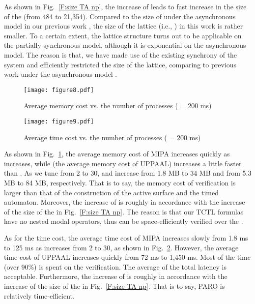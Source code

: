 \documentclass[10pt,conference,compsocconf,letterpaper]{IEEEtran}
\begin{document}
As shown in Fig.~\ref{F:size TA np}, the increase of  leads to fast increase in the size of the  (from 484 to 21,354). Compared to the size of  under the asynchronous model in our previous work \cite{Yang13}, the size of the lattice (i.e., ) in this work is rather smaller. To a certain extent, the lattice structure turns out to be applicable on the partially synchronous model, although it is exponential on the asynchronous model. The reason is that, we have made use of the existing synchrony of the system and efficiently restricted the size of the lattice, comparing to previous work under the asynchronous model \cite{Schwarz94, Yang13}.
\begin{figure}[tbp]
\begin{center}
  \texttt{[image: figure8.pdf]}
  \caption{Average memory cost vs. the number of processes ( = 200 ms)}
  \label{F:memory vs np}
\end{center}
\end{figure}
\begin{figure}[t]
\begin{center}
  \texttt{[image: figure9.pdf]}
  \caption{Average time cost vs. the number of processes ( = 200 ms)}
  \label{F:time vs np}
\end{center}
\end{figure}

As shown in Fig.~\ref{F:memory vs np}, the average memory cost of MIPA  increases quickly as  increases, while  (the average memory cost of UPPAAL) increases a little faster than . As we tune  from 2 to 30,  and  increase from 1.8 MB to 34 MB and from 5.3 MB to 84 MB, respectively. That is to say, the memory cost of verification is larger than that of the construction of the active surface and the timed automaton. Moreover, the increase of  is roughly in accordance with the increase of the size of the  in Fig.~\ref{F:size TA np}. The reason is that our TCTL formulas have no nested modal operators, thus can be space-efficiently verified over the .

As for the time cost, the average time cost of MIPA  increases slowly from 1.8 ms to 125 ms as  increases from 2 to 30, as shown in Fig.~\ref{F:time vs np}. However, the average time cost of UPPAAL  increases quickly from 72 ms to 1,450 ms. Most of the time (over 90\%) is spent on the verification. The average of the total latency is acceptable. Furthermore, the increase of  is roughly in accordance with the increase of the size of the  in Fig.~\ref{F:size TA np}. That is to say, \textsf{PARO} is relatively time-efficient.
\end{document}
